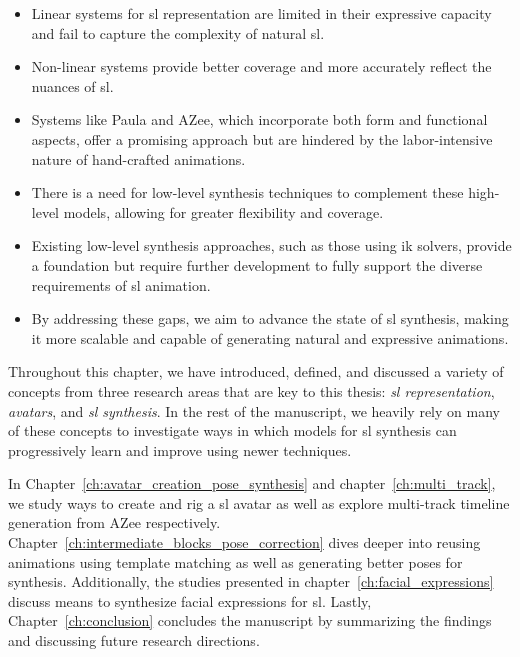 \documentclass[../../main.tex]{subfiles}
\begin{document}
\begin{itemize} 
  \item Linear systems for \gls{sl} representation are limited in their expressive capacity and fail to capture the complexity of natural \gls{sl}. %
  \item Non-linear systems provide better coverage and more accurately reflect the nuances of \gls{sl}.
  \item Systems like Paula and AZee, which incorporate both form and functional aspects, offer a promising approach but are hindered by the labor-intensive nature of hand-crafted animations.
  \item There is a need for low-level synthesis techniques to complement these high-level models, allowing for greater flexibility and coverage.
  \item Existing low-level synthesis approaches, such as those using \gls{ik} solvers, provide a foundation but require further development to fully support the diverse requirements of \gls{sl} animation.
  \item By addressing these gaps, we aim to advance the state of \gls{sl} synthesis, making it more scalable and capable of generating natural and expressive animations.
\end{itemize}

Throughout this chapter, we have introduced, defined, and discussed a variety of concepts from three research areas that are key to this thesis: \textit{\gls{sl} representation}, \textit{avatars}, and \textit{\gls{sl} synthesis}. In the rest of the manuscript, we heavily rely on many of these concepts to investigate ways in which models for \gls{sl} synthesis can progressively learn and improve using newer techniques.

In Chapter~\ref{ch:avatar_creation_pose_synthesis} and chapter~\ref{ch:multi_track}, we study ways to create and rig a \gls{sl} avatar as well as explore multi-track timeline generation from AZee respectively. Chapter~\ref{ch:intermediate_blocks_pose_correction} dives deeper into reusing animations using template matching as well as generating better poses for synthesis. Additionally, the studies presented in chapter~\ref{ch:facial_expressions} discuss means to synthesize facial expressions for \gls{sl}. Lastly, Chapter~\ref{ch:conclusion} concludes the manuscript by summarizing the findings and discussing future research directions.
\end{document}

